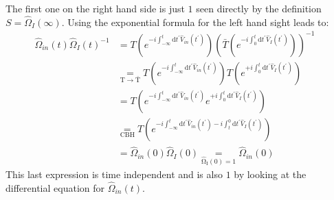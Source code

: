 \documentclass[12pt, titlepage]{article}
\begin{document}
The first one on the right hand side is just $ 1 $ seen directly by the  definition $ S = \hat{\Omega}_{I}(\infty) $.
Using the exponential formula for the left hand sight leads to:
\begin{subequations}
\begin{align}
	\hat{\Omega}_{in}(t)\hat{\Omega}_{I}(t)^{-1}&=
T\left( e^{-i\int_{-\infty}^{t}\mathrm{d}t^{\prime} \hat{V}_{in}(t^{\prime})} \right)
 \left( \bar{T}\left( e^{-i\int_{0}^{t}\mathrm{d}t^{\prime} \hat{V}_{I}(t^{\prime})} \right)
	\right)^{-1}
	&\\
	 &\underset{\mathrm{T\rightarrow\bar{T} }}{=} 
	 T\left( e^{-i\int_{-\infty}^{t}\mathrm{d}t^{\prime} \hat{V}_{in}(t^{\prime})} \right)
  T\left( e^{+i\int_{0}^{t}\mathrm{d}t^{\prime} \hat{V}_{I}(t^{\prime})} \right)
  &\\
  &=
  T\left( e^{-i\int_{-\infty}^{t}\mathrm{d}t^{\prime} \hat{V}_{in}(t^{\prime})}
  e^{+i\int_{0}^{t}\mathrm{d}t^{\prime} \hat{V}_{I}(t^{\prime})} \right)
  	&\\
	 &\underset{\mathrm{CBH}}{=} 
T\left( e^{-i\int_{-\infty}^{t}\mathrm{d}t^{\prime} \hat{V}_{in}(t^{\prime})
 -i\int_{t}^{0}\mathrm{d}t^{\prime} \hat{V}_{I}(t^{\prime}) }\right) 
  &\\
  &= 	\hat{\Omega}_{in}(0) 	\hat{\Omega}_{I}(0)\underset{\mathrm{\hat{\Omega}_{I}(0)=1}}{=} 	\hat{\Omega}_{in}(0)
\end{align}
\end{subequations}
This last expression is time independent and is also $ 1 $ by looking at the differential equation for $\hat{\Omega}_{in}(t) $.
\end{document}
